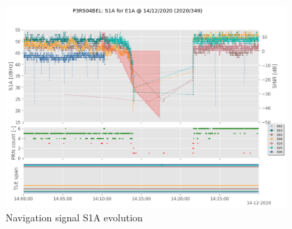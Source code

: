 \begin{enumerate}
\begin{figure}[H]%
\centering%
\includegraphics[width=0.95\textwidth]{png/P3RS04BEL_R_20203490000_01D_00U_MO_E-E1A-S1A.png}%
\caption{\label{fig:tle_navsig_ES1A} Navigation signal S1A evolution}%
\end{figure}


\end{enumerate}
